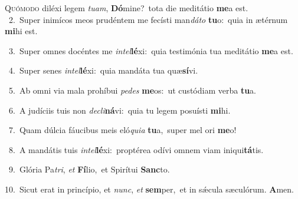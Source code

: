 \lettrine{\initial\textcolor{\initialcolor}{Q}}{uómodo} diléxi legem \textit{tu}\-\textit{am}, \textbf{Dó}\-mine?~\star tota die meditátio \textbf{me}\-a est.\\
{\numbfont\textcolor{\numbcolor}{~2.}}~Super inimícos meos prudéntem me fecísti man\-\textit{dá}\-\textit{to} \textbf{tu}\-o:~\star quia in ætérnum \textbf{mi}\-hi est.\par
{\numbfont\textcolor{\numbcolor}{~3.}}~Super omnes docéntes me \textit{in}\-\textit{tel}\textbf{lé}xi:~\star quia testimónia tua meditátio \textbf{me}\-a est.\par
{\numbfont\textcolor{\numbcolor}{~4.}}~Super senes \textit{in}\-\textit{tel}\textbf{lé}xi:~\star quia mandáta tua quæ\-\textbf{sí}\-vi.\par
{\numbfont\textcolor{\numbcolor}{~5.}}~Ab omni via mala prohíbui \textit{pe}\-\textit{des} \textbf{me}\-os:~\star ut custódiam verba \textbf{tu}\-a.\par
{\numbfont\textcolor{\numbcolor}{~6.}}~A judíciis tuis non \textit{de}\-\textit{cli}\textbf{ná}vi:~\star quia tu legem posuísti \textbf{mi}\-hi.\par
{\numbfont\textcolor{\numbcolor}{~7.}}~Quam dúlcia fáucibus meis eló\-\textit{qui}\-\textit{a} \textbf{tu}\-a,~\star super mel ori \textbf{me}\-o!\par
{\numbfont\textcolor{\numbcolor}{~8.}}~A mandátis tuis \textit{in}\-\textit{tel}\textbf{lé}xi:~\star proptérea odívi omnem viam iniqui\-\textbf{tá}\-tis.\par
{\numbfont\textcolor{\numbcolor}{~9.}}~Glória Pa\-\textit{tri}\-, \textit{et} \textbf{Fí}\-lio,~\star et Spirítui \textbf{Sanc}\-to.\par
{\numbfont\textcolor{\numbcolor}{10.}}~Sicut erat in princípio, et \textit{nunc}\-, \textit{et} \textbf{sem}\-per,~\star et in sǽcula sæculórum. \textbf{A}\-men.\par
